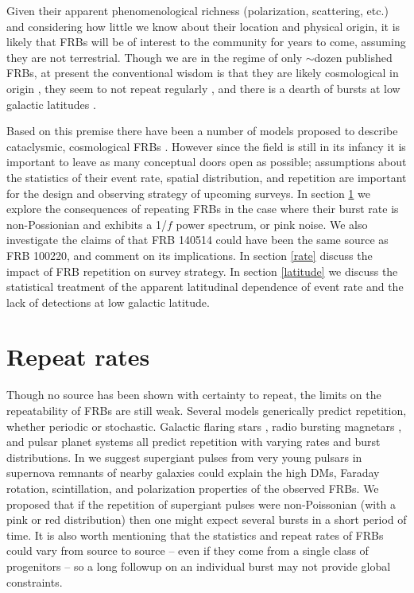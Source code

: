 \documentclass[useAMS,usenatbib]{mn2e}
\begin{document}
Given their apparent phenomenological richness
(polarization, scattering, etc.) and considering
how little we know about their location and physical 
origin, it is likely that FRBs will be of interest to the community for 
years to come, assuming they are not terrestrial.
Though we are in the regime of only $\sim$dozen published FRBs, 
at present the conventional wisdom is that they are likely cosmological
in origin \citep{2013Sci...341...53T}, they seem to not repeat regularly
\citep{2015MNRAS.454..457P}, and there is a dearth of bursts 
at low galactic latitudes \citep{2014ApJ...789L..26P, 2014ApJ...792...19B, 2015MNRAS.451.3278M}.

Based on this premise there have been 
a number of models proposed to describe cataclysmic, cosmological 
FRBs \citep{2012ApJ...760...64M, 2013PASJ...65L..12T, 2014A&A...562A.137F, 2015ApJ...814L..20M}.
However since the field is still in its infancy it is important to
leave as many conceptual doors open as possible;
assumptions about the statistics of their event rate, 
spatial distribution, and repetition are important for the design
and observing strategy of upcoming surveys. In section \ref{repeat} we explore the 
consequences of repeating FRBs in the case where their 
burst rate is non-Possionian and exhibits a 1/$f$ power spectrum, 
or pink noise. We also investigate the claims of \cite{2015arXiv150701002M}
that FRB 140514 could have been the same source as FRB 100220, 
and comment on its implications. In section \ref{rate}
discuss the impact of FRB repetition on survey strategy. In section \ref{latitude}
we discuss the statistical treatment of the apparent latitudinal dependence 
of event rate and the lack of detections at low galactic latitude.


\section{Repeat rates}
\label{repeat}

Though no source has been shown with certainty to repeat, 
the limits on the repeatability of FRBs are still weak. Several 
models generically predict repetition, whether periodic or stochastic. 
Galactic flaring stars \citep{2015arXiv150701002M}, radio bursting 
magnetars \citep{2007arXiv0710.2006P, 2015ApJ...807..179P}, and pulsar planet systems 
\citep{2014A&A...569A..86M} all predict repetition with varying 
rates and burst distributions. In \cite{2015arXiv150505535C} we 
suggest supergiant pulses from very young pulsars in supernova 
remnants of nearby galaxies could explain the high DMs, Faraday rotation, 
scintillation, and polarization properties of the observed FRBs. We  
proposed that if the repetition of supergiant pulses were non-Poissonian 
(with a pink or red distribution) 
then one might expect several bursts in a short period of time.
It is also worth mentioning that the statistics and repeat rates of FRBs 
could vary from source to source -- even if 
they come from a single class of progenitors -- so a long followup on an individual burst 
may not provide global constraints.
\end{document}
